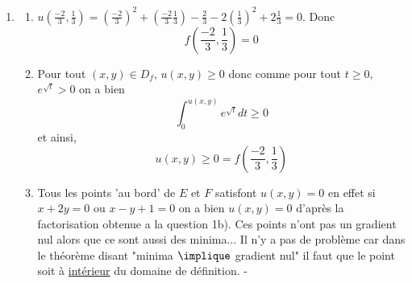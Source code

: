 \begin{correction}
\begin{enumerate}
\begin{enumerate}
\end{enumerate}
\item \begin{enumerate}
\item $u\left(\frac{-2}{3},\frac{1}{3}\right) =\left(\frac{-2}{3}\right)^2 +\left(\frac{-2}{3} \frac{1}{3}\right)  -\frac{2}{3}  -2 \left(\frac{1}{3}\right)^2 +2 \frac{1}{3} = 0$. Donc 
$$f\left(\frac{-2}{3},\frac{1}{3}\right) = 0$$
\item Pour tout $(x,y) \in D_f$, $u(x,y) \geq 0$ donc comme pour tout $t\geq 0, $  $e^{\sqrt{t}}>0$ on  a bien 
$$\int_0^{u(x,y)} e^{\sqrt{t}} dt \geq 0$$
et ainsi, $$u(x,y) \geq 0 =f\left(\frac{-2}{3},\frac{1}{3}\right)  $$
\item Tous les points 'au bord' de $E$ et $F$ satisfont $u(x,y)=0$ en effet si 
$x+2y = 0 $ ou $x-y+1=0$ on a bien $u(x,y) =0$ d'après la factorisation obtenue a la question 1b). 
Ces points n'ont pas un gradient nul alors que ce sont aussi des minima... Il n'y a pas de problème car dans le théorème disant "minima $\implique$ gradient nul" il faut que le point soit à \underline{intérieur} du domaine de définition. -
\end{enumerate}
\end{enumerate}

\end{correction}